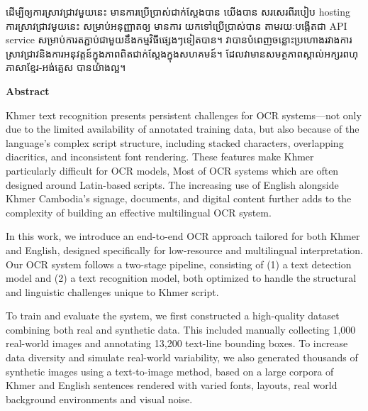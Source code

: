 \begin{adjustwidth}{0.2cm}{0.2cm}
    ដើម្បីឲ្យការស្រាវជ្រាវមួយនេះ មានការប្រើប្រាស់ជាក់ស្ដែងបាន យើងបាន សរសេរពីរបៀប 
    hosting ការស្រាវជ្រាវមូយនេះ សម្រាប់អនុញ្ញាតឲ្យ មានការ យកទៅប្រើប្រាស់បាន 
    តាមរយៈបង្កើតជា API service សម្រាប់ការតភ្ជាប់ជាមួយនឹងកម្មវិធីផ្សេងៗទៀតបាន។ 
    វាបានបំពេញចន្លោះប្រហោងរវាងការស្រាវជ្រាវនិងការអនុវត្តន៍ក្នុងភាពពិតជាក់ស្ដែងក្នុងសហគមន៍។
    ដែលវាមានសមត្ថភាពស្គាល់អក្សរពហុភាសាខ្មែរ-អង់គ្លេស បានយ៉ាងល្អ។   
    \vspace{2cm}
    
    \begin{center}
        {\bfseries\LARGE Abstract \par}
    \end{center}
    \label{abstract}
    \vspace{0.5cm}
    \englishfont
    \large
    
    Khmer text recognition presents persistent challenges for OCR 
    systems—not only due to the limited availability of annotated 
    training data, but also because of the language's complex script 
    structure, including stacked characters, overlapping diacritics, 
    and inconsistent font rendering. These features make Khmer 
    particularly difficult for OCR models, Most of OCR systems which 
    are often designed around Latin-based scripts. The increasing 
    use of English alongside Khmer Cambodia’s signage, documents, 
    and digital content further adds to the complexity of building 
    an effective multilingual OCR system.

    In this work, we introduce an end-to-end OCR approach tailored 
    for both Khmer and English, designed specifically for 
    low-resource and multilingual interpretation. Our OCR system 
    follows a two-stage pipeline, consisting of (1) a text detection 
    model and (2) a text recognition model, both optimized to handle 
    the structural and linguistic challenges unique to Khmer script.

    To train and evaluate the system, we first constructed a 
    high-quality dataset combining both real and synthetic data. 
    This included manually collecting 1,000 real-world images and 
    annotating 13,200 text-line bounding boxes. To increase data 
    diversity and simulate real-world variability, we also generated 
    thousands of synthetic images using a text-to-image method, 
    based on a large corpora of Khmer and English sentences rendered 
    with varied fonts, layouts, real world background environments 
    and visual noise.


\end{adjustwidth}
